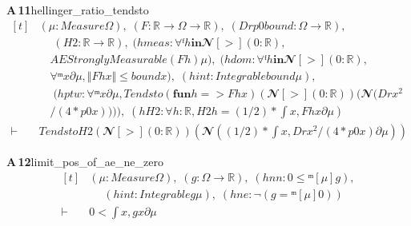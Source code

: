 \documentclass[conference]{IEEEtran}
\theoremstyle{definition}
\newcommand{\lean}[1]{\textsf{\footnotesize #1}}
\begin{document}
\noindent\textbf{A\,11}\quad\lean{hellinger\_ratio\_tendsto}
{\footnotesize\[ \begin{aligned}[t]
&(\mu : \mathit{Measure} \Omega ),\; (\mathit{F} : \mathbb{R} \to \Omega \to \mathbb{R} ),\; (\mathit{Dr} \mathit{p0} \mathit{bound} : \Omega \to \mathbb{R} ),\\
&\quad \; (\mathit{H2} : \mathbb{R} \to \mathbb{R} ),\; (\mathit{hmeas} : \forall  ᶠ \mathit{h} \mathbf{in} 𝓝[>] (0:\mathbb{R} ),\\
&\quad \mathit{AEStronglyMeasurable} (\mathit{F} \mathit{h}) \mu ),\; (\mathit{hdom} : \forall  ᶠ \mathit{h} \mathbf{in} 𝓝[>] (0:\mathbb{R} ),\\
&\quad \forall  ᵐ \mathit{x} ∂\mu , \Vert \mathit{F} \mathit{h} \mathit{x}\Vert \leq \mathit{bound} \mathit{x}),\; (\mathit{hint} : \mathit{Integrable} \mathit{bound} \mu ),\\
&\quad \; (\mathit{hptw} : \forall  ᵐ \mathit{x} ∂\mu , \mathit{Tendsto} (\mathbf{fun} \mathit{h} => \mathit{F} \mathit{h} \mathit{x}) (𝓝[>] (0:\mathbb{R} )) (𝓝 (\mathit{Dr} \mathit{x} ^{2}\\
&\quad / (4 * \mathit{p0} \mathit{x})))),\; (\mathit{hH2} : \forall \mathit{h} : \mathbb{R} , \mathit{H2} \mathit{h} = (1/2) * \int \mathit{x}, \mathit{F} \mathit{h} \mathit{x} ∂\mu )\\
\vdash\;&\mathit{Tendsto} \mathit{H2} (𝓝[>] (0:\mathbb{R} )) (𝓝 ((1/2) * \int \mathit{x}, \mathit{Dr} \mathit{x} ^{2} / (4 * \mathit{p0} \mathit{x}) ∂\mu ))
\end{aligned} \]}

\noindent\textbf{A\,12}\quad\lean{limit\_pos\_of\_ae\_ne\_zero}
{\footnotesize\[ \begin{aligned}[t]
&(\mu : \mathit{Measure} \Omega ),\; (\mathit{g} : \Omega \to \mathbb{R} ),\; (\mathit{hnn} : 0 \leq  ᵐ[\mu ] \mathit{g}),\\
&\quad \; (\mathit{hint} : \mathit{Integrable} \mathit{g} \mu ),\; (\mathit{hne} : \neg (\mathit{g} =ᵐ[\mu ] 0))\\
\vdash\;&0 < \int \mathit{x}, \mathit{g} \mathit{x} ∂\mu
\end{aligned} \]}
\end{document}
